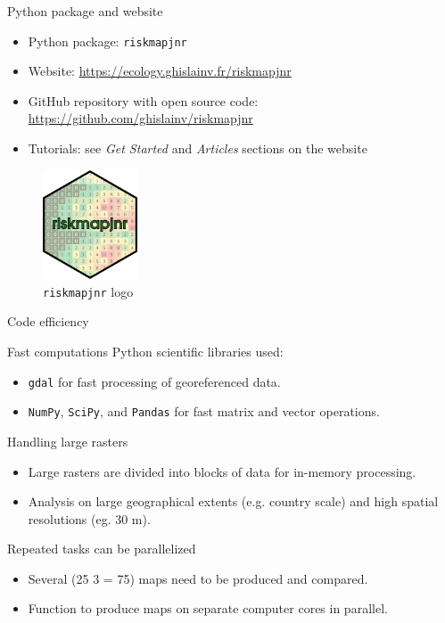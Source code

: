 \documentclass[10pt,table,dvipsnames,compress]{beamer}
\begin{document}
\begin{frame}[label={sec:org496d94d},fragile]{Python package and website}
 \begin{itemize}
\item Python package: \texttt{riskmapjnr}
\item Website: \url{https://ecology.ghislainv.fr/riskmapjnr}
\item GitHub repository with open source code: \url{https://github.com/ghislainv/riskmapjnr}
\item Tutorials: see \emph{Get Started} and \emph{Articles} sections on the website
\end{itemize}

\begin{figure}[htbp]
\centering
\includegraphics[width=0.25\textwidth]{figs/logo-riskmapjnr.png}
\caption{\texttt{riskmapjnr} logo}
\end{figure}
\end{frame}

\begin{frame}[label={sec:org72947a0},fragile]{Code efficiency}
 \begin{block}{Fast computations}
Python scientific libraries used:
\begin{itemize}
\item \texttt{gdal} for fast processing of georeferenced data.
\item \texttt{NumPy}, \texttt{SciPy}, and \texttt{Pandas} for fast matrix and vector operations.
\end{itemize}
\end{block}

\begin{block}{Handling large rasters}
\begin{itemize}
\item Large rasters are divided into blocks of data for in-memory processing.
\item Analysis on large geographical extents (e.g. country scale) and high spatial resolutions (eg. 30 m).
\end{itemize}
\end{block}

\begin{block}{Repeated tasks can be parallelized}
\begin{itemize}
\item Several (25 \texttimes{} 3 = 75) maps need to be produced and compared.
\item Function to produce maps on separate computer cores in parallel.
\end{itemize}
\end{block}
\end{frame}
\end{document}
